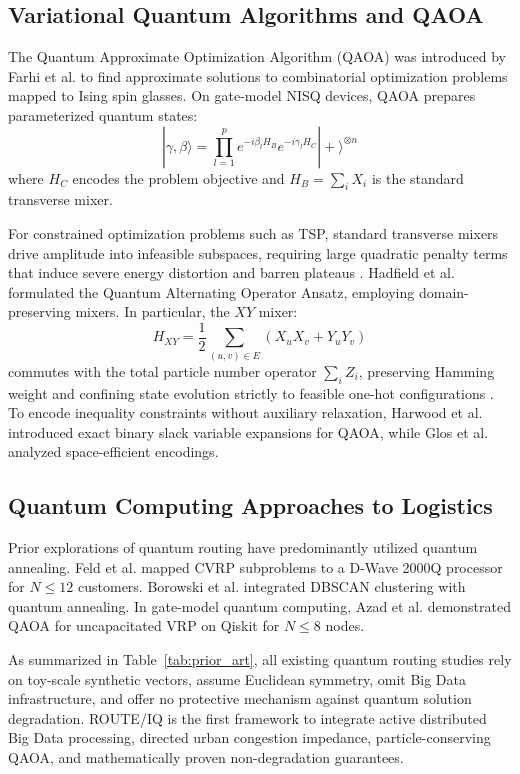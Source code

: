 \documentclass[journal,10pt]{IEEEtran}
\begin{document}
\subsection{Variational Quantum Algorithms and QAOA}
The Quantum Approximate Optimization Algorithm (QAOA) was introduced by Farhi et al. \cite{farhi2014qaoa} to find approximate solutions to combinatorial optimization problems mapped to Ising spin glasses. On gate-model NISQ devices, QAOA prepares parameterized quantum states:
\begin{equation}
|\gamma, \beta\rangle = \prod_{l=1}^p e^{-i \beta_l H_B} e^{-i \gamma_l H_C} |+\rangle^{\otimes n}
\end{equation}
where $H_C$ encodes the problem objective and $H_B = \sum_i X_i$ is the standard transverse mixer.

For constrained optimization problems such as TSP, standard transverse mixers drive amplitude into infeasible subspaces, requiring large quadratic penalty terms that induce severe energy distortion and barren plateaus \cite{mcclean2018barren}. Hadfield et al. \cite{hadfield2019qaoa} formulated the Quantum Alternating Operator Ansatz, employing domain-preserving mixers. In particular, the $XY$ mixer:
\begin{equation}
H_{XY} = \frac{1}{2} \sum_{(u, v) \in E} (X_u X_v + Y_u Y_v)
\end{equation}
commutes with the total particle number operator $\sum_i Z_i$, preserving Hamming weight and confining state evolution strictly to feasible one-hot configurations \cite{wang2020xy}. To encode inequality constraints without auxiliary relaxation, Harwood et al. \cite{harwood2021formulating} introduced exact binary slack variable expansions for QAOA, while Glos et al. \cite{glos2022space} analyzed space-efficient encodings.

\subsection{Quantum Computing Approaches to Logistics}
Prior explorations of quantum routing have predominantly utilized quantum annealing. Feld et al. \cite{feld2019hybrid} mapped CVRP subproblems to a D-Wave 2000Q processor for $N \le 12$ customers. Borowski et al. \cite{borowski2020new} integrated DBSCAN clustering with quantum annealing. In gate-model quantum computing, Azad et al. \cite{azad2022solving} demonstrated QAOA for uncapacitated VRP on Qiskit for $N \le 8$ nodes. 

As summarized in Table~\ref{tab:prior_art}, all existing quantum routing studies rely on toy-scale synthetic vectors, assume Euclidean symmetry, omit Big Data infrastructure, and offer no protective mechanism against quantum solution degradation. ROUTE/IQ is the first framework to integrate active distributed Big Data processing, directed urban congestion impedance, particle-conserving QAOA, and mathematically proven non-degradation guarantees.
\end{document}
